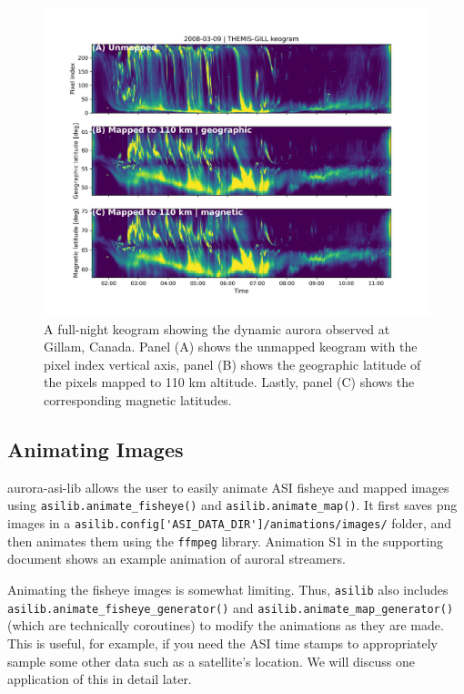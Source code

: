 \documentclass[utf8]{FrontiersinHarvard} %
\begin{document}
\begin{figure}
      \includegraphics[width=\textwidth]{figures/fig3.jpg}
      \caption{A full-night keogram showing the dynamic aurora observed at Gillam, Canada. Panel (A) shows the unmapped keogram with the pixel index vertical axis, panel (B) shows the geographic latitude of the pixels mapped to 110 km altitude. Lastly, panel (C) shows the corresponding magnetic latitudes.}
      \label{fig3}
\end{figure}


\subsection{Animating Images}
aurora-asi-lib allows the user to easily animate ASI fisheye and mapped images using \verb|asilib.animate_fisheye()| and \verb|asilib.animate_map()|. It first saves png images in a \verb|asilib.config['ASI_DATA_DIR']/animations/images/| folder, and then animates them using the \verb|ffmpeg| \cite{ffmpeg} library. Animation S1 in the supporting document shows an example animation of auroral streamers.

Animating the fisheye images is somewhat limiting. Thus, \verb|asilib| also includes \verb|asilib.animate_fisheye_generator()| and \verb|asilib.animate_map_generator()| (which are technically coroutines) to modify the animations as they are made. This is useful, for example, if you need the ASI time stamps to appropriately sample some other data such as a satellite's location. We will discuss one application of this in detail later.
\end{document}
